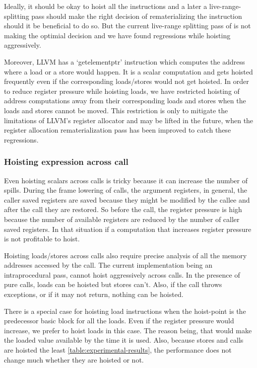 \documentclass[acmlarge,review]{acmart}\settopmatter{printfolios=true}
\begin{document}
Ideally, it should be okay to hoist all the instructions and a later a
live-range-splitting \cite{cooper1998live} pass should make the right decision
of rematerializing the instruction should it be beneficial to do so. But the
current live-range splitting pass of \LLVM{} is not making the optimial decision
and we have found regressions while hoisting aggressively.

Moreover, LLVM has a `getelementptr' instruction which computes the address
where a load or a store would happen. It is a scalar computation and gets
hoisted frequently even if the corresponding loads/stores would not get hoisted.
In order to reduce register pressure while hoisting loads, we have restricted
hoisting of address computations away from their corresponding loads and stores
when the loads and stores cannot be moved.  This restriction is only to mitigate
the limitations of LLVM's register allocator and may be lifted in the future,
when the register allocation rematerialization pass has been improved to catch
these regressions.

\subsubsection{Hoisting expression across call}
\label{cost:across-calls}
Even hoisting scalars across calls is tricky because it can increase the number
of spills. During the frame lowering of calls, the argument registers, in
general, the caller saved registers are saved because they might be modified by
the callee and after the call they are restored. So before the call, the
register pressure is high because the number of available registers are reduced
by the number of caller saved registers. In that situation if a computation
that increases register pressure is not profitable to hoist.

Hoisting loads/stores across calls also require precise analysis of all the
memory addresses accessed by the call. The current implementation being an
intraprocedural pass, cannot hoist aggressively across calls. In the presence of
pure calls, loads can be hoisted but stores can't. Also, if the call throws
exceptions, or if it may not return, nothing can be hoisted.

There is a special case for hoisting load instructions when the hoist-point is
the predecessor basic block for all the loads. Even if the register pressure
would increase, we prefer to hoist loads in this case. The reason being, that
would make the loaded value available by the time it is used. Also, because
stores and calls are hoisted the least \ref{table:experimental-results}, the
performance does not change much whether they are hoisted or not.
\end{document}
